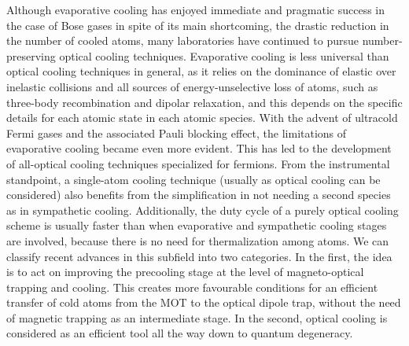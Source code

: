 \documentclass[pra,letterpaper,twocolumn,showpacs,superscriptaddress]{revtex4}
\begin{document}
Although evaporative cooling has enjoyed immediate and pragmatic success in the case of Bose gases in spite of its main shortcoming, the 
drastic reduction in the number of cooled atoms, many laboratories have continued to pursue number-preserving optical cooling techniques. 
Evaporative cooling is less universal than optical cooling techniques in general, as it relies on the dominance of  elastic over inelastic 
collisions and all sources of energy-unselective loss of atoms, such as three-body recombination and dipolar relaxation, 
and this depends on the specific details for each atomic state in each atomic species. With the advent of ultracold Fermi gases and the associated 
Pauli blocking effect, the limitations of evaporative cooling became even more evident. This has led to the development of all-optical cooling 
techniques specialized for fermions. From the instrumental standpoint, a single-atom cooling technique (usually as optical cooling can be considered) 
also benefits from the simplification in not needing a second species as in sympathetic cooling. Additionally, the duty cycle of a purely 
optical cooling scheme is usually faster than when evaporative and sympathetic cooling stages are involved, because there is no need for thermalization among atoms. 
We can classify recent advances in this subfield into two categories. In the first, the idea is to act on 
improving the precooling stage at the level of magneto-optical trapping and cooling.  This creates more favourable conditions for 
an efficient transfer of cold atoms from the MOT to the optical dipole trap, without the need of magnetic trapping as an intermediate stage. 
In the second, optical cooling is considered as an efficient tool all the way down to quantum degeneracy. 
\end{document}
